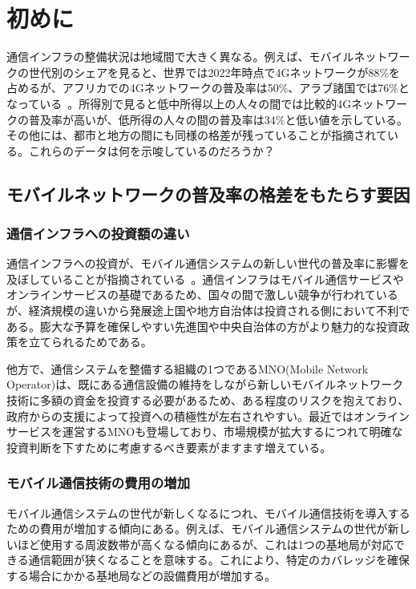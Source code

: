 \section{初めに}\label{section:初めに}
通信インフラの整備状況は地域間で大きく異なる。例えば、モバイルネットワークの世代別のシェアを見ると、世界では2022年時点で4Gネットワークが88\%を占めるが、アフリカでの4Gネットワークの普及率は50\%、アラブ諸国では76\%となっている~\cite{ITUFactsAndFigures2022}。所得別で見ると低中所得以上の人々の間では比較的4Gネットワークの普及率が高いが、低所得の人々の間の普及率は34\%と低い値を示している。その他には、都市と地方の間にも同様の格差が残っていることが指摘されている。これらのデータは何を示唆しているのだろうか？
\subsection{モバイルネットワークの普及率の格差をもたらす要因}\label{subsection:モバイルネットワークの普及率の格差をもたらす要因}
\subsubsection{通信インフラへの投資額の違い}\label{subsubsection:通信インフラへの投資}
通信インフラへの投資が、モバイル通信システムの新しい世代の普及率に影響を及ぼしていることが指摘されている~\cite{ForgeFormingA5GStrategyForDevelopingCountries2020}。通信インフラはモバイル通信サービスやオンラインサービスの基礎であるため、国々の間で激しい競争が行われているが、経済規模の違いから発展途上国や地方自治体は投資される側において不利である。膨大な予算を確保しやすい先進国や中央自治体の方がより魅力的な投資政策を立てられるためである。

他方で、通信システムを整備する組織の1つであるMNO(Mobile Network Operator)は、既にある通信設備の維持をしながら新しいモバイルネットワーク技術に多額の資金を投資する必要があるため、ある程度のリスクを抱えており、政府からの支援によって投資への積極性が左右されやすい。最近ではオンラインサービスを運営するMNOも登場しており、市場規模が拡大するにつれて明確な投資判断を下すために考慮するべき要素がますます増えている。
\subsubsection{モバイル通信技術の費用の増加}\label{subsubsection:モバイル通信技術の費用の増加}
モバイル通信システムの世代が新しくなるにつれ、モバイル通信技術を導入するための費用が増加する傾向にある。例えば、モバイル通信システムの世代が新しいほど使用する周波数帯が高くなる傾向にあるが、これは1つの基地局が対応できる通信範囲が狭くなることを意味する。これにより、特定のカバレッジを確保する場合にかかる基地局などの設備費用が増加する。

